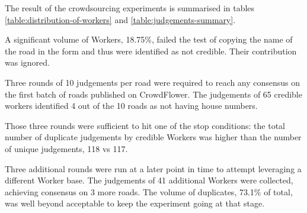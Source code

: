 The result of the crowdsourcing experiments is summarised in tables \ref{table:distribution-of-workers} and \ref{table:judgements-summary}. 

A significant volume of Workers, 18.75\%, failed the test of copying the name of the road in the form and thus were identified as not credible. Their contribution was ignored.

Three rounds of 10 judgements per road were required to reach any consensus on the first batch of roads published on CrowdFlower. The judgements of 65 credible workers identified 4 out of the 10 roads as not having house numbers.

Those three rounds were sufficient to hit one of the stop conditions: the total number of duplicate judgements by credible Workers was higher than the number of unique judgements, 118 vs 117.

Three additional rounds were run at a later point in time to attempt leveraging a different Worker base. The judgements of 41 additional Workers were collected, achieving consensus on 3 more roads. The volume of duplicates,  73.1\% of total, was well beyond acceptable to keep the experiment going at that stage.


